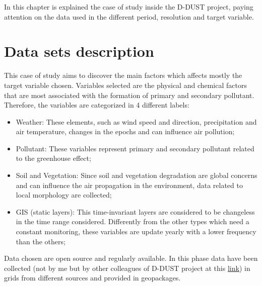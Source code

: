 In this chapter is explained the case of study inside the D-DUST project, paying attention on the data used in the different period, resolution and target variable. 

\section{Data sets description}
This case of study aims to discover the main factors which affects mostly the target variable chosen. 
Variables selected are the physical and chemical factors that are most associated with the formation of primary and secondary pollutant. \newline
Therefore, the variables are categorized in 4 different labels:
\begin{itemize}
\item Weather: These elements, such as wind speed and direction, precipitation and air temperature, changes in the epochs and can influence air pollution;
\item Pollutant: These variables represent primary and secondary pollutant related to the greenhouse effect;
\item Soil and Vegetation: Since soil and vegetation degradation are global concerns and can influence the air propagation in the environment, data related to local morphology are collected;
\item GIS (static layers): This time-invariant layers are considered to be changeless in the time range considered. Differently from the other types which need a constant monitoring, these variables are update yearly with a lower frequency than the others;
\end{itemize}
Data chosen are open source and regularly available.
In this phase data have been collected (not by me but by other colleagues of D-DUST project at this \underline{ \href{https://docs.google.com/spreadsheets/d/1-5pwMSc1QlFyC8iIaA-l1fWhWtpqVio2/edit\#gid=91313358}{link}}) in grids from different sources and provided in geopackages. 

